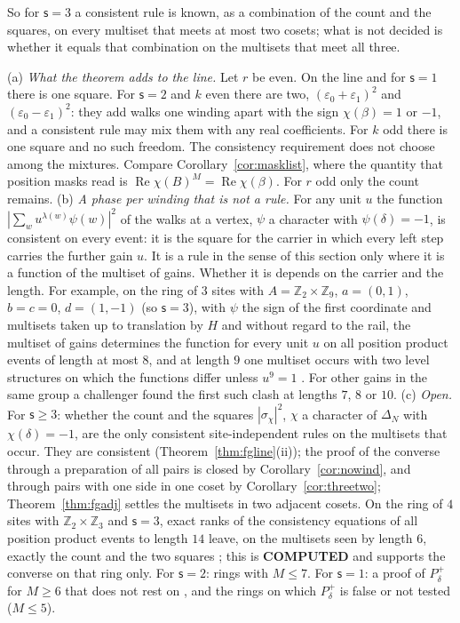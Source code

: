 So for $\mathsf{s}=3$ a consistent rule is known, as a combination of the count and the squares, on every multiset that meets at most two cosets; what is not decided is whether it equals that combination on the multisets that meet all three.

\begin{remark}\label{rem:winding}
(a) \emph{What the theorem adds to the line.} Let $r$ be even. On the line and for $\mathsf{s}=1$ there is one square. For $\mathsf{s}=2$ and $k$ even there are two, $(\varepsilon_0+\varepsilon_1)^{2}$ and $(\varepsilon_0-\varepsilon_1)^{2}$: they add walks one winding apart with the sign $\chi(\beta)=1$ or $-1$, and a consistent rule may mix them with any real coefficients. For $k$ odd there is one square and no such freedom. The consistency requirement does not choose among the mixtures. Compare Corollary~\ref{cor:masklist}, where the quantity that position masks read is $\operatorname{Re}\chi(B)^{M}=\operatorname{Re}\chi(\beta)$. For $r$ odd only the count remains.
(b) \emph{A phase per winding that is not a rule.} For any unit $u$ the function $|\sum_w u^{\lambda(w)}\psi(w)|^{2}$ of the walks at a vertex, $\psi$ a character with $\psi(\delta)=-1$, is consistent on every event: it is the square for the carrier in which every left step carries the further gain $u$. It is a rule in the sense of this section only where it is a function of the multiset of gains. Whether it is depends on the carrier and the length. For example, on the ring of $3$ sites with $A=\mathbb{Z}_2\times\mathbb{Z}_9$, $a=(0,1)$, $b=c=0$, $d=(1,-1)$ (so $\mathsf{s}=3$), with $\psi$ the sign of the first coordinate and multisets taken up to translation by $H$ and without regard to the rail, the multiset of gains determines the function for every unit $u$ on all position product events of length at most $8$, and at length $9$ one multiset occurs with two level structures on which the functions differ unless $u^{9}=1$ \cite{comp4s}. For other gains in the same group a challenger found the first such clash at lengths $7$, $8$ or $10$.
(c) \emph{Open.} For $\mathsf{s}\ge3$: whether the count and the squares $|\sigma_\chi|^{2}$, $\chi$ a character of $\Delta_N$ with $\chi(\delta)=-1$, are the only consistent site-independent rules on the multisets that occur. They are consistent (Theorem~\ref{thm:fgline}(ii)); the proof of the converse through a preparation of all pairs is closed by Corollary~\ref{cor:nowind}, and through pairs with one side in one coset by Corollary~\ref{cor:threetwo}; Theorem~\ref{thm:fgadj} settles the multisets in two adjacent cosets. On the ring of $4$ sites with $\mathbb{Z}_2\times\mathbb{Z}_3$ and $\mathsf{s}=3$, exact ranks of the consistency equations of all position product events to length $14$ leave, on the multisets seen by length $6$, exactly the count and the two squares \cite{comp4s}; this is \textbf{COMPUTED} and supports the converse on that ring only. For $\mathsf{s}=2$: rings with $M\le7$. For $\mathsf{s}=1$: a proof of $P^{+}_\delta$ for $M\ge6$ that does not rest on \cite{dgone}, and the rings on which $P^{+}_\delta$ is false or not tested ($M\le5$).

\end{remark}
